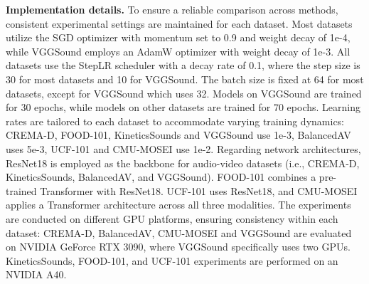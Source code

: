 \textbf{Implementation details.} 
To ensure a reliable comparison across methods, consistent experimental settings are maintained for each dataset. Most datasets utilize the SGD optimizer with momentum set to 0.9 and weight decay of 1e-4, while VGGSound employs an AdamW optimizer with weight decay of 1e-3. All datasets use the StepLR scheduler with a decay rate of 0.1, where the step size is 30 for most datasets and 10 for VGGSound. The batch size is fixed at 64 for most datasets, except for VGGSound which uses 32. Models on VGGSound are trained for 30 epochs, while models on other datasets are trained for 70 epochs. Learning rates are tailored to each dataset to accommodate varying training dynamics: CREMA-D, FOOD-101, KineticsSounds and VGGSound use 1e-3, BalancedAV uses 5e-3, UCF-101 and CMU-MOSEI use 1e-2. Regarding network architectures, ResNet18 is employed as the backbone for audio-video datasets (i.e., CREMA-D, KineticsSounds, BalancedAV, and VGGSound). FOOD-101 combines a pre-trained Transformer with ResNet18. UCF-101 uses ResNet18, and CMU-MOSEI applies a Transformer architecture across all three modalities. The experiments are conducted on different GPU platforms, ensuring consistency within each dataset: CREMA-D, BalancedAV, CMU-MOSEI and VGGSound are evaluated on NVIDIA GeForce RTX 3090, where VGGSound specifically uses two GPUs. KineticsSounds, FOOD-101, and UCF-101 experiments are performed on an NVIDIA A40.